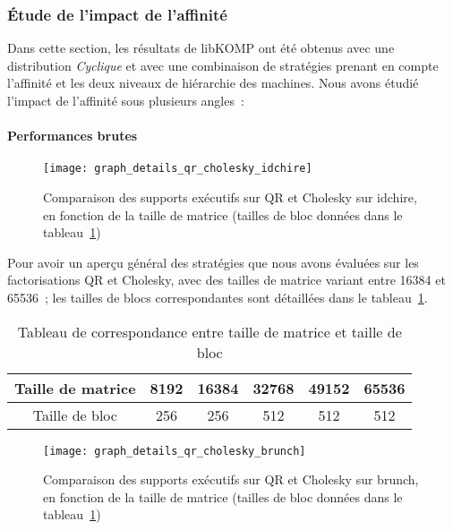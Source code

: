 \subsubsection{Étude de l'impact de l'affinité}

Dans cette section, les résultats de libKOMP ont été obtenus avec une distribution \emph{Cyclique} et avec une combinaison de stratégies prenant en compte l'affinité et les deux niveaux de hiérarchie des machines.
Nous avons étudié l'impact de l'affinité sous plusieurs angles~:

\paragraph{Performances brutes}

\begin{figure}[h!]
  \centering
  \texttt{[image: graph\_details\_qr\_cholesky\_idchire]}
  \caption{Comparaison des supports exécutifs sur QR et Cholesky sur idchire, en fonction de la taille de matrice (tailles de bloc données dans le tableau~\ref{tab:perf_eval:blocksizes})}\label{fig:contribs:perf_eval:eval-qr-cholesky}
\end{figure}

Pour avoir un aperçu général des stratégies que nous avons évaluées sur les factorisations QR et Cholesky, avec des tailles de matrice variant entre 16384 et 65536~; les tailles de blocs correspondantes sont détaillées dans le tableau~\ref{tab:perf_eval:blocksizes}.

\begin{table}[h!]
\def\arraystretch{1.5}
\centering
\begin{tabular}{|c|c|c|c|c|c|}\hline
  Taille de matrice & 8192 & 16384 & 32768 & 49152 & 65536 \\\hline
  Taille de bloc & 256 & 256 & 512 & 512 & 512 \\\hline
\end{tabular}
\caption{Tableau de correspondance entre taille de matrice et taille de bloc}\label{tab:perf_eval:blocksizes}
\end{table}

\begin{figure}[h!]
  \centering
  \texttt{[image: graph\_details\_qr\_cholesky\_brunch]}
  \caption{Comparaison des supports exécutifs sur QR et Cholesky sur brunch, en fonction de la taille de matrice (tailles de bloc données dans le tableau~\ref{tab:perf_eval:blocksizes})}\label{fig:contribs:perf_eval:eval-qr-cholesky-brunch}
\end{figure}

